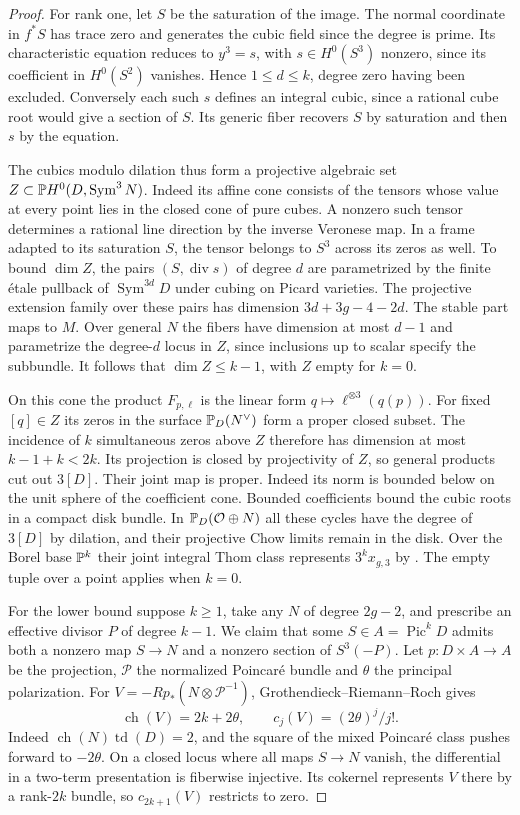 \begin{proof}
For rank one, let $S$ be the saturation of the image. The normal
coordinate in $f^*S$ has trace zero and generates the cubic field since
the degree is prime. Its characteristic equation reduces to $y^3=s$,
with $s\in H^0(S^3)$ nonzero, since its coefficient in $H^0(S^2)$
vanishes. Hence $1\leq d\leq k$, degree zero having been excluded.
Conversely each such $s$ defines an integral cubic, since a rational
cube root would give a section of $S$. Its generic fiber recovers $S$
by saturation and then $s$ by the equation.

The cubics modulo dilation thus form a projective algebraic set
$Z\subset\mathbb P H^0(D,\operatorname{Sym}^3N)$. Indeed its affine
cone consists of the tensors whose value at every point lies in the
closed cone of pure cubes. A nonzero such tensor determines a rational
line direction by the inverse Veronese map. In a frame adapted to its
saturation $S$, the tensor belongs to $S^3$ across its zeros as well.
To bound $\dim Z$, the pairs $(S,\operatorname{div}s)$ of degree $d$
are parametrized by the finite \'etale pullback of $\operatorname{Sym}^{3d}D$
under cubing on Picard varieties. The projective extension family over
these pairs has dimension $3d+3g-4-2d$. The stable part maps to $M$.
Over general $N$ the fibers have dimension at most $d-1$ and parametrize
the degree-$d$ locus in $Z$, since inclusions up to scalar specify the
subbundle. It follows that $\dim Z\leq k-1$, with $Z$ empty for $k=0$.

On this cone the product $F_{p,\ell}$ is the linear form
$q\mapsto\ell^{\otimes3}(q(p))$. For fixed $[q]\in Z$ its zeros in the
surface $\mathbb P_D(N^\vee)$ form a proper closed subset. The incidence
of $k$ simultaneous zeros above $Z$ therefore has dimension at most
$k-1+k<2k$. Its projection is closed by projectivity of $Z$, so general
products cut out $3[D]$. Their joint map is proper. Indeed its norm is
bounded below on the unit sphere of the coefficient cone. Bounded
coefficients bound the cubic roots in a compact disk bundle. In
$\mathbb P_D(\mathcal O\oplus N)$ all these cycles have the degree of
$3[D]$ by dilation, and their projective Chow limits remain in the disk.
Over the Borel base $\mathbb P^k$ their joint
integral Thom class represents $3^kx_{g,3}$ by
\cite[Definition~4.7 and (4.16)]{Pardon}. The empty tuple over a point
applies when $k=0$.

For the lower bound suppose $k\geq1$, take any $N$ of degree $2g-2$,
and prescribe an effective divisor $P$ of degree $k-1$. We claim that
some $S\in A=\operatorname{Pic}^kD$ admits both a nonzero map $S\to N$
and a nonzero section of $S^3(-P)$. Let $p:D\times A\to A$ be the
projection, $\mathcal P$ the normalized Poincar\'e bundle and $\theta$
the principal polarization. For $V=-Rp_*(N\otimes\mathcal P^{-1})$,
Grothendieck--Riemann--Roch gives
\[
 \operatorname{ch}(V)=2k+2\theta,\qquad c_j(V)=(2\theta)^j/j!.
\]
Indeed $\operatorname{ch}(N)\operatorname{td}(D)=2$, and the square of
the mixed Poincar\'e class pushes forward to $-2\theta$. On a closed
locus where all maps $S\to N$ vanish, the differential in a two-term
presentation is fiberwise injective. Its cokernel represents $V$ there
by a rank-$2k$ bundle, so $c_{2k+1}(V)$ restricts to zero.


\end{proof}
